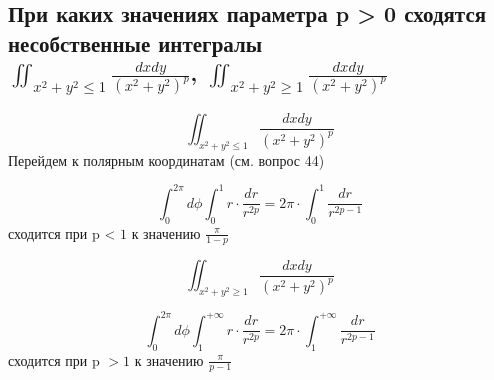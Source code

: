 
\subsection{При каких значениях параметра p > 0 сходятся несобственные интегралы\\ $\iint_{x^2 + y^2 \leqslant 1}\frac{dxdy}{(x^2 + y^2)^p}$, $\iint_{x^2 + y^2 \geqslant 1}\frac{dxdy}{(x^2 + y^2)^p}$}
\[\iint_{x^2 + y^2 \leqslant 1}\frac{dxdy}{(x^2 + y^2)^p}\]
Перейдем к полярным координатам (см. вопрос 44)

\[\int_{0}^{2\pi}d\phi\int_{0}^{1}r \cdot \frac{dr}{r^{2p}} = 2\pi\cdot\int_{0}^{1}\frac{dr}{r^{2p - 1}}\]
сходится при p < $1$ к значению $\frac{\pi}{1 - p}$

\[\iint_{x^2 + y^2 \geqslant 1}\frac{dxdy}{(x^2 + y^2)^p}\]

\[\int_{0}^{2\pi}d\phi\int_{1}^{+\infty}r \cdot \frac{dr}{r^{2p}} = 2\pi\cdot\int_{1}^{+\infty}\frac{dr}{r^{2p-1}}\]
сходится при p $>1$ к значению $\frac{\pi}{p - 1}$

